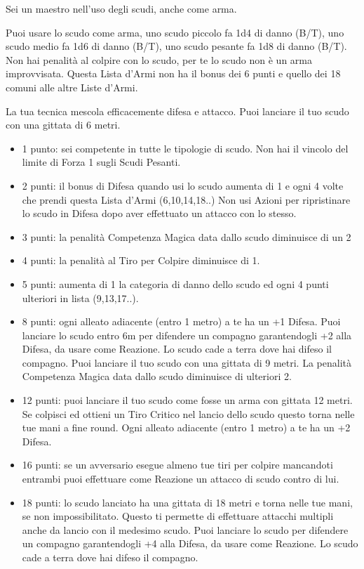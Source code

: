 \begin{multicols}{2}
Sei un maestro nell'uso degli scudi, anche come arma.

Puoi usare lo scudo come arma, uno scudo piccolo fa 1d4 di danno (B/T), uno scudo medio fa 1d6 di danno (B/T), uno scudo pesante fa 1d8 di danno (B/T).
Non hai penalità al colpire con lo scudo, per te lo scudo non è un arma improvvisata. Questa Lista d'Armi non ha il bonus dei 6 punti e quello dei 18 comuni alle altre Liste d'Armi.

La tua tecnica mescola efficacemente difesa e attacco. Puoi lanciare il tuo scudo con una gittata di 6 metri.

\begin{itemize}[leftmargin=*] \setlength{\itemsep}{0pt}
\item 1 punto: sei competente in tutte le tipologie di scudo. Non hai il vincolo del limite di Forza 1 sugli Scudi Pesanti.
\item 2 punti: il bonus di Difesa quando usi lo scudo aumenta di 1 e ogni 4 volte che prendi questa Lista d'Armi (6,10,14,18..) Non usi Azioni per ripristinare lo scudo in Difesa dopo aver effettuato un attacco con lo stesso.
\item 3 punti: la penalità Competenza Magica data dallo scudo diminuisce di un 2
\item 4 punti: la penalità al Tiro per Colpire diminuisce di 1.
\item 5 punti: aumenta di 1 la categoria di danno dello scudo ed ogni 4 punti ulteriori in lista (9,13,17..).
\item 8 punti: ogni alleato adiacente (entro 1 metro) a te ha un +1 Difesa. Puoi lanciare lo scudo entro 6m per difendere un compagno garantendogli +2 alla Difesa, da usare come Reazione. Lo scudo cade a terra dove hai difeso il compagno. Puoi lanciare il tuo scudo con una gittata di 9 metri. La penalità Competenza Magica data dallo scudo diminuisce di ulteriori 2.
\item 12 punti: puoi lanciare il tuo scudo come fosse un arma con gittata 12 metri. Se colpisci ed ottieni un Tiro Critico nel lancio dello scudo questo torna nelle tue mani a fine round. Ogni alleato adiacente (entro 1 metro) a te ha un +2 Difesa.
\item 16 punti: se un avversario esegue almeno tue tiri per colpire mancandoti entrambi puoi effettuare come Reazione un attacco di scudo contro di lui.
\item 18 punti: lo scudo lanciato ha una gittata di 18 metri e torna nelle tue mani, se non impossibilitato. Questo ti permette di effettuare attacchi multipli anche da lancio con il medesimo scudo. Puoi lanciare lo scudo per difendere un compagno garantendogli +4 alla Difesa, da usare come Reazione. Lo scudo cade a terra dove hai difeso il compagno.


\end{itemize}
\end{multicols}
